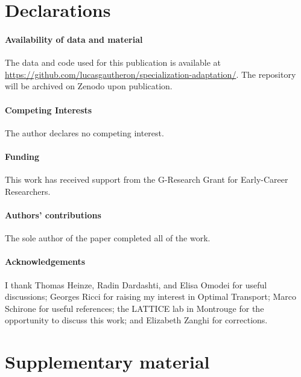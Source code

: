 \documentclass{article}
\begin{document}

\printglossaries

\section*{Declarations}

\paragraph{Availability of data and material}{The data and code used for this publication is available at \url{https://github.com/lucasgautheron/specialization-adaptation/}. The repository will be archived on Zenodo upon publication.}

\paragraph{Competing Interests}{The author declares no competing interest.}

\paragraph{Funding}{This work has received support from the G-Research Grant for Early-Career Researchers.}

\paragraph{Authors' contributions}{The sole author of the paper completed all of the work.}

\paragraph{Acknowledgements}{I thank Thomas Heinze, Radin Dardashti, and Elisa Omodei for useful discussions; Georges Ricci for raising my interest in Optimal Transport; Marco Schirone for useful references; the LATTICE lab in Montrouge for the opportunity to discuss this work; and Elizabeth Zanghi for corrections.}



\printbibliography

\newpage

\appendix

\section{Supplementary material}
\end{document}
